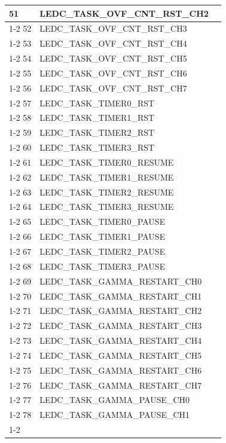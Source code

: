 \documentclass[main\_\_EN.tex]{subfiles}
\begin{document}
\begin{longtable}{ | l | l | l | }
51  & LEDC\_TASK\_OVF\_CNT\_RST\_CH2& \\ \cline{1-2}
52  & LEDC\_TASK\_OVF\_CNT\_RST\_CH3& \\ \cline{1-2}
53  & LEDC\_TASK\_OVF\_CNT\_RST\_CH4& \\ \cline{1-2}
54  & LEDC\_TASK\_OVF\_CNT\_RST\_CH5& \\ \cline{1-2}
55  & LEDC\_TASK\_OVF\_CNT\_RST\_CH6& \\ \cline{1-2}
56  & LEDC\_TASK\_OVF\_CNT\_RST\_CH7& \\ \cline{1-2}
57  & LEDC\_TASK\_TIMER0\_RST  & \\ \cline{1-2}
58  & LEDC\_TASK\_TIMER1\_RST  & \\ \cline{1-2}
59  & LEDC\_TASK\_TIMER2\_RST  & \\ \cline{1-2}
60  & LEDC\_TASK\_TIMER3\_RST  & \\ \cline{1-2}
61  & LEDC\_TASK\_TIMER0\_RESUME    & \\ \cline{1-2}
62  & LEDC\_TASK\_TIMER1\_RESUME    & \\ \cline{1-2}
63  & LEDC\_TASK\_TIMER2\_RESUME    & \\ \cline{1-2}
64  & LEDC\_TASK\_TIMER3\_RESUME    & \\ \cline{1-2}
65  & LEDC\_TASK\_TIMER0\_PAUSE& \\ \cline{1-2}
66  & LEDC\_TASK\_TIMER1\_PAUSE& \\ \cline{1-2}
67  & LEDC\_TASK\_TIMER2\_PAUSE& \\ \cline{1-2}
68  & LEDC\_TASK\_TIMER3\_PAUSE& \\ \cline{1-2}
69  & LEDC\_TASK\_GAMMA\_RESTART\_CH0      & \\ \cline{1-2}
70  & LEDC\_TASK\_GAMMA\_RESTART\_CH1      & \\ \cline{1-2}
71  & LEDC\_TASK\_GAMMA\_RESTART\_CH2      & \\ \cline{1-2}
72  & LEDC\_TASK\_GAMMA\_RESTART\_CH3      & \\ \cline{1-2}
73  & LEDC\_TASK\_GAMMA\_RESTART\_CH4      & \\ \cline{1-2}
74  & LEDC\_TASK\_GAMMA\_RESTART\_CH5      & \\ \cline{1-2}
75  & LEDC\_TASK\_GAMMA\_RESTART\_CH6      & \\ \cline{1-2}
76  & LEDC\_TASK\_GAMMA\_RESTART\_CH7      & \\ \cline{1-2}
77  & LEDC\_TASK\_GAMMA\_PAUSE\_CH0 & \\ \cline{1-2}
78  & LEDC\_TASK\_GAMMA\_PAUSE\_CH1 & \\ \cline{1-2}

\end{longtable}
\end{document}
